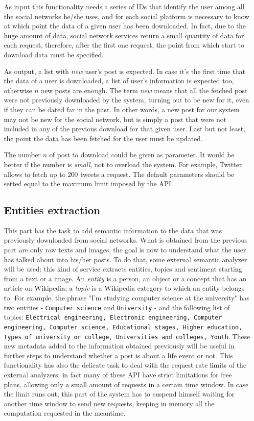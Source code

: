 As input this functionality needs a series of IDs that identify the user among all the social networks he/she uses, and for each social platform is necessary to know at which point the data of a given user has been downloaded. In fact, due to the huge amount of data, social network services return a small quantity of data for each request, therefore, after the first one request, the point from which start to download data must be specified.

As output, a list with \textit{new} user's post is expected. In case it's the first time that the data of a user is downloaded, a list of user's information is expected too, otherwise $ n $ new posts are enough. The term \textit{new} means that all the fetched post were not previously downloaded by the system, turning out to be new for it, even if they can be dated far in the past. In other words, a new post for our system may not be new for the social network, but is simply a post that were not included in any of the previous download for that given user. Last but not least, the point the data has been fetched for the user must be updated.

The number $ n $ of post to download could be given as parameter. It would be better if the number is \textit{small}, not to overload the system. For example, Twitter allows to fetch up to $ 200 $ tweets a request. The default parameters should be setted equal to the maximum limit imposed by the API.

\subsection{Entities extraction}
This part has the task to add semantic information to the data that was previously downloaded from social networks. What is obtained from the previous part are only raw texts and images, the goal is now to understand what the user has talked about into his/her posts. To do that, some external semantic analyzer will be used: this kind of service extracts entities, topics and sentiment starting from a text or a image.
An \textit{entity} is a person, an object or a concept that has an article on Wikipedia; a \textit{topic} is a Wikipedia category to which an entity belongs to. For example, the phrase "I'm studying computer science at the university" has two entities - \texttt{Computer science} and \texttt{University} - and the following list of topics: \texttt{Electrical engineering, Electronic engineering, Computer engineering, Computer science, Educational stages, Higher education, Types of university or college, Universities and colleges, Youth}. These new metadata added to the information obtained previously will be useful in further steps to understand whether a post is about a life event or not. This functionality has also the delicate task to deal with the request rate limits of the external analyzers: in fact many of these API have strict limitations for free plans, allowing only a small amount of requests in a certain time window. In case the limit runs out, this part of the system has to suspend himself waiting for another time window to send new requests, keeping in memory all the computation requested in the meantime.

